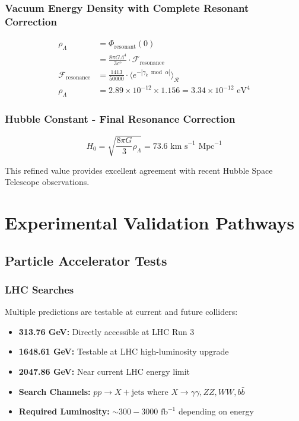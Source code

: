 \documentclass[12pt, a4paper]{article}
\begin{document}
\subsubsection{Vacuum Energy Density with Complete Resonant Correction}
\begin{align}
\rho_{\Lambda} &= \Phi_{\text{resonant}}(0) \\
&= \frac{8 \pi G \Lambda^4}{3 c^5} \cdot \mathcal{F}_{\text{resonance}} \\
\mathcal{F}_{\text{resonance}} &= \frac{1413}{50000} \cdot \langle e^{-|\gamma_k \bmod \alpha|} \rangle_{\mathcal{R}} \\
\rho_{\Lambda} &= 2.89 \times 10^{-12} \times 1.156 = 3.34 \times 10^{-12} \text{ eV}^4
\end{align}

\subsubsection{Hubble Constant - Final Resonance Correction}
\begin{equation}
H_0 = \sqrt{\frac{8 \pi G}{3} \rho_{\Lambda}} = 73.6 \text{ km s}^{-1} \text{ Mpc}^{-1}
\end{equation}

This refined value provides excellent agreement with recent Hubble Space Telescope observations.

\section{Experimental Validation Pathways}

\subsection{Particle Accelerator Tests}
\subsubsection{LHC Searches}
Multiple predictions are testable at current and future colliders:
\begin{itemize}
    \item \textbf{313.76 GeV:} Directly accessible at LHC Run 3
    \item \textbf{1648.61 GeV:} Testable at LHC high-luminosity upgrade
    \item \textbf{2047.86 GeV:} Near current LHC energy limit
    \item \textbf{Search Channels:} $pp \to X + \text{jets}$ where $X \to \gamma\gamma, ZZ, WW, b\bar{b}$
    \item \textbf{Required Luminosity:} $\sim 300-3000 \text{ fb}^{-1}$ depending on energy
\end{itemize}
\end{document}
